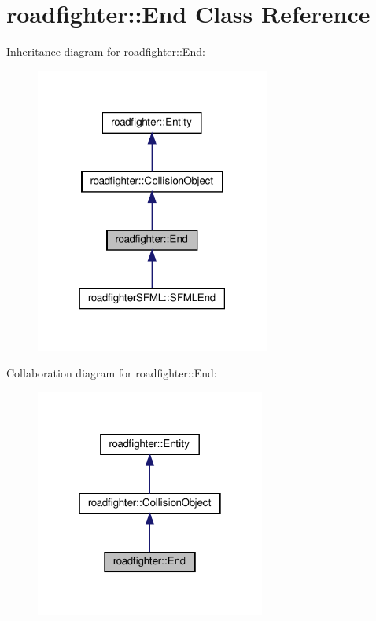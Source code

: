 \hypertarget{classroadfighter_1_1End}{}\section{roadfighter\+:\+:End Class Reference}
\label{classroadfighter_1_1End}


Inheritance diagram for roadfighter\+:\+:End\+:
\nopagebreak
\begin{figure}[H]
\begin{center}
\leavevmode
\includegraphics[width=218pt]{classroadfighter_1_1End__inherit__graph}
\end{center}
\end{figure}


Collaboration diagram for roadfighter\+:\+:End\+:\nopagebreak
\begin{figure}[H]
\begin{center}
\leavevmode
\includegraphics[width=214pt]{classroadfighter_1_1End__coll__graph}
\end{center}
\end{figure}
